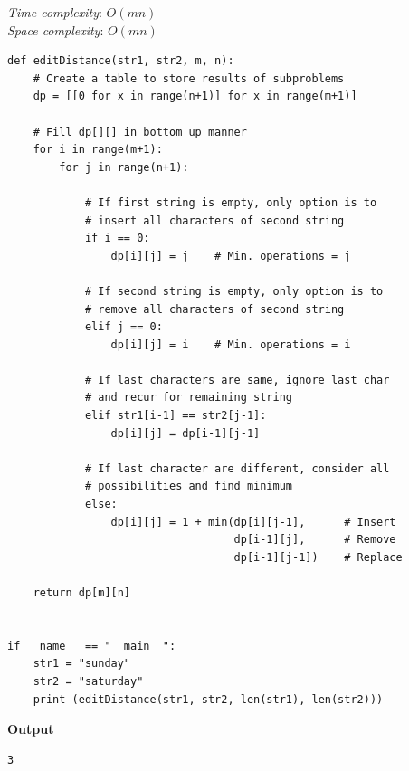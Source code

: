 \documentclass[a4paper,11pt]{book}
\begin{document}
\noindent \textit{Time complexity}: $O(mn)$\\
\noindent \textit{Space complexity}: $O(mn)$

\begin{lstlisting}
def editDistance(str1, str2, m, n):
    # Create a table to store results of subproblems
    dp = [[0 for x in range(n+1)] for x in range(m+1)]
 
    # Fill dp[][] in bottom up manner
    for i in range(m+1):
        for j in range(n+1):
 
            # If first string is empty, only option is to
            # insert all characters of second string
            if i == 0:
                dp[i][j] = j    # Min. operations = j
 
            # If second string is empty, only option is to
            # remove all characters of second string
            elif j == 0:
                dp[i][j] = i    # Min. operations = i
 
            # If last characters are same, ignore last char
            # and recur for remaining string
            elif str1[i-1] == str2[j-1]:
                dp[i][j] = dp[i-1][j-1]
 
            # If last character are different, consider all
            # possibilities and find minimum
            else:
                dp[i][j] = 1 + min(dp[i][j-1],      # Insert
                                   dp[i-1][j],      # Remove
                                   dp[i-1][j-1])    # Replace
 
    return dp[m][n]
 
 
if __name__ == "__main__":
    str1 = "sunday"
    str2 = "saturday"
    print (editDistance(str1, str2, len(str1), len(str2)))
\end{lstlisting}
\textbf{Output}
\begin{lstlisting}
3
\end{lstlisting}
\end{document}
